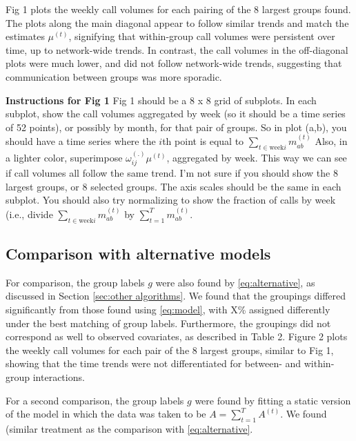 \documentclass{article}
\begin{document}
Fig 1 plots the weekly call volumes for each pairing of the 8 largest groups found. The plots along the main diagonal appear to follow similar trends and match the estimates $\mu^{(t)}$, signifying that within-group call volumes were persistent over time, up to network-wide trends. In contrast, the call volumes in the off-diagonal plots were much lower, and did not follow network-wide trends, suggesting that communication between groups was more sporadic.

\textbf{Instructions for Fig 1} Fig 1 should be a 8 x 8 grid of subplots. In each subplot, show the call volumes aggregated by week (so it should be a time series of 52 points), or possibly by month, for that pair of groups. So in plot (a,b), you should have a time series where the $i$th point is equal to $\sum_{t \in \textrm{week} i} m_{ab}^{(t)}$ Also, in a lighter color, superimpose $\omega_{ij}^{(.)} \mu^{(t)}$, aggregated by week. This way we can see if call volumes all follow the same trend. I'm not sure if you should show the 8 largest groups, or 8 selected groups. The axis scales should be the same in each subplot. You should also try  normalizing to show the fraction of calls by week (i.e., divide $\sum_{t \in \textrm{week} i} m_{ab}^{(t)}$ by $\sum_{t=1}^T m_{ab}^{(t)}$.
 
\subsection{Comparison with alternative models}

For comparison, the group labels $g$ were also found by \eqref{eq:alternative}, as discussed in Section \ref{sec:other algorithms}. We found that the groupings differed significantly from those found using \eqref{eq:model}, with X\% assigned differently under the best matching of group labels. Furthermore, the groupings did not correspond as well to observed covariates, as described in Table 2. Figure 2 plots the weekly call volumes for each pair of the 8 largest groups, similar to Fig 1, showing that the time trends were not differentiated for between- and within- group interactions.

For a second comparison, the group labels $g$ were found by fitting a static version of the model in which the data was taken to be $A = \sum_{t=1}^T A^{(t)}$. We found (similar treatment as the comparison with \eqref{eq:alternative}.
\end{document}
